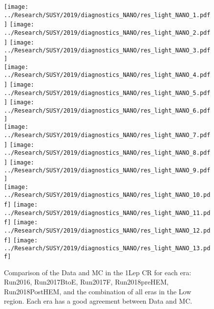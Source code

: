 \begin{figure}[!htb]
	\begin{center}
  \texttt{[image: ../Research/SUSY/2019/diagnostics\_NANO/res\_light\_NANO\_1.pdf]}
  \texttt{[image: ../Research/SUSY/2019/diagnostics\_NANO/res\_light\_NANO\_2.pdf]} 
  \texttt{[image: ../Research/SUSY/2019/diagnostics\_NANO/res\_light\_NANO\_3.pdf]} \\
  \texttt{[image: ../Research/SUSY/2019/diagnostics\_NANO/res\_light\_NANO\_4.pdf]}
  \texttt{[image: ../Research/SUSY/2019/diagnostics\_NANO/res\_light\_NANO\_5.pdf]} 
  \texttt{[image: ../Research/SUSY/2019/diagnostics\_NANO/res\_light\_NANO\_6.pdf]} \\
  \texttt{[image: ../Research/SUSY/2019/diagnostics\_NANO/res\_light\_NANO\_7.pdf]}
  \texttt{[image: ../Research/SUSY/2019/diagnostics\_NANO/res\_light\_NANO\_8.pdf]} 
  \texttt{[image: ../Research/SUSY/2019/diagnostics\_NANO/res\_light\_NANO\_9.pdf]} \\
  \texttt{[image: ../Research/SUSY/2019/diagnostics\_NANO/res\_light\_NANO\_10.pdf]}
  \texttt{[image: ../Research/SUSY/2019/diagnostics\_NANO/res\_light\_NANO\_11.pdf]} 
  \texttt{[image: ../Research/SUSY/2019/diagnostics\_NANO/res\_light\_NANO\_12.pdf]}     
  \texttt{[image: ../Research/SUSY/2019/diagnostics\_NANO/res\_light\_NANO\_13.pdf]} \\      
	\end{center}
	\caption{Comparison of the Data and MC in the 1Lep CR for each era: Run2016, Run2017BtoE, Run2017F, Run2018preHEM, Run2018PostHEM, and the combination of all eras in the Low \dm{} region. Each era has a good agreement between Data and MC. 
	 }
	\label{fig:qcd-1lcr-datavsmc-lm-inclusive}
\end{figure}
